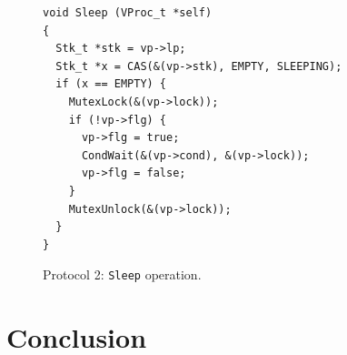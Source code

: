 \documentclass[11pt]{article}
\begin{document}
\begin{figure}
\lstset{language=C}
\lstset{commentstyle=\textit}
\lstset{numbers=left}
\begin{lstlisting}
void Sleep (VProc_t *self)
{
  Stk_t *stk = vp->lp;
  Stk_t *x = CAS(&(vp->stk), EMPTY, SLEEPING);
  if (x == EMPTY) {
    MutexLock(&(vp->lock));
    if (!vp->flg) {
      vp->flg = true;
      CondWait(&(vp->cond), &(vp->lock));
      vp->flg = false;
    }
    MutexUnlock(&(vp->lock));
  }
}
\end{lstlisting}
\caption{Protocol 2: \texttt{Sleep} operation.}
\end{figure}

\section{Conclusion}\label{sec:conclusion}
\end{document}
